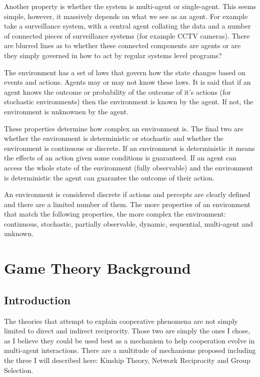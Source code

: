 \documentclass[]{final_report}
\begin{document}
Another property is whether the system is multi-agent or single-agent. This seems simple, however, it massively depends on what we see as an agent. For example take a surveillance system, with a central agent collating the data and a number of connected pieces of surveillance systems (for example CCTV cameras). There are blurred lines as to whether these connected components are agents or are they simply governed in how to act by regular systems level programs?\par 
The environment has a set of laws that govern how the state changes based on events and actions. Agents may or may not know these laws. It is said that if an agent knows the outcome or probability of the outcome of it's actions (for stochastic environments) then the environment is known by the agent. If not, the environment is unknownen by the agent.\par 
These properties determine how complex an environment is. The final two are whether the environment is deterministic or stochastic and whether the environment is continuous or discrete. If an environment is deterministic it means the effects of an action given some conditions is guaranteed. If an agent can access the whole state of the environment (fully observable) and the environment is deterministic the agent can guarantee the outcome of their action.\par 
An environment is considered discrete if actions and percepts are clearly defined and there are a limited number of them. The more properties of an environment that match the following properties, the more complex the environment: continuous, stochastic, partially observable, dynamic, sequential, multi-agent and unknown.

\section{Game Theory Background}
\subsection{Introduction}
The theories that attempt to explain cooperative phenomena are not simply limited to direct and indirect reciprocity. Those two are simply the ones I chose, as I believe they could be used best as a mechanism to help cooperation evolve in multi-agent interactions. There are a multitude of mechanisms proposed including the three I will described here: Kinship Theory, Network Reciprocity and Group Selection.
\end{document}
